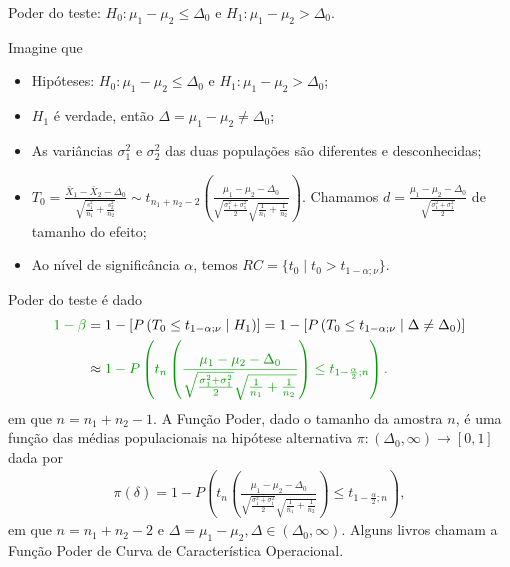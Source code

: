\documentclass[9pt]{beamer}
\begin{document}
\begin{frame}{Poder do teste: $H_0:\mu_1 - \mu_2 \leq \Delta_0$ e $H_1: \mu_1 - \mu_2 > \Delta_0$.}

\tiny

Imagine que
\begin{itemize}
	\item Hipóteses: $H_0: \mu_1 - \mu_2 \leq \Delta_0$ e $H_1: \mu_1 -  \mu_2 > \Delta_0$;
	\item $H_1$ é verdade, então $\Delta = \mu_1-\mu_2 \neq \Delta_0$;
	\item As variâncias $\sigma_1^2$  e $\sigma_2^2$ das duas populações são diferentes e desconhecidas;
	\item $T_0 = \frac{\bar{X}_1 - \bar{X}_2 - \Delta_0}{ \sqrt{ \frac{s_1^2}{n_1} + \frac{s_2^2}{n_2} } } \sim t_{n_1+n_2-2}\left( \frac{\mu_1 - \mu_2 - \Delta_0}{\sqrt{\frac{\sigma_1^2 + \sigma_1^2}{2}} \sqrt{\frac{1}{n_1} + \frac{1}{n_2}}} \right)$. Chamamos $d = \frac{\mu_1 - \mu_2 - \Delta_0}{\sqrt{\frac{\sigma_1^2 + \sigma_1^2}{2}}}$ de tamanho do efeito;
	\item Ao nível de significância $\alpha$, temos $RC = \{ t_0 \mid t_0 > t_{1-\alpha;\nu} \}$.
\end{itemize}
\vfill	

Poder do teste é dado
\begin{align*}
\textcolor{important}{1-\beta} &=1 - \left[P\left( T_0 \leq t_{1-\alpha;\nu} \mid H_1 \right)\right] = 1 - \left[P\left( T_0 \leq t_{1-\alpha;\nu} \mid \Delta \neq \Delta_0 \right)\right]\\ 
&\approx \textcolor{important}{1 - P\left( t_{n}\left( \frac{ \mu_1 - \mu_2 - \Delta_0 }{\sqrt{\frac{\sigma_1^2 + \sigma_1^2}{2}} \sqrt{\frac{1}{n_1} + \frac{1}{n_2}}} \right) \leq t_{1-\frac{\alpha}{2};n} \right).}
\end{align*}
em que $n = n_1 + n_2 - 1$. A \textcolor{important}{Função Poder}, dado o tamanho da amostra $n$, é uma função das médias populacionais na hipótese alternativa  $\pi: (\Delta_0, \infty) \longrightarrow [0,1]$ dada por
\begin{align*}
\pi(\delta) = 1 - P\left( t_{n}\left( \frac{ \mu_1 - \mu_2 - \Delta_0 }{\sqrt{\frac{\sigma_1^2 + \sigma_1^2}{2}} \sqrt{\frac{1}{n_1} + \frac{1}{n_2}}} \right) \leq t_{1-\frac{\alpha}{2};n} \right),
\end{align*}
em que $n=n_1+n_2-2$ e $\Delta = \mu_1 - \mu_2, \Delta \in (\Delta_0, \infty)$. Alguns livros chamam a Função Poder de \textcolor{important}{Curva de Característica Operacional.}

\normalsize

\end{frame}
\end{document}
